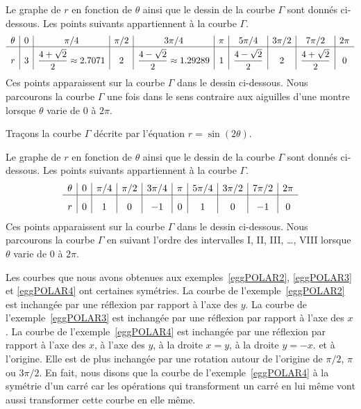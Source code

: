 {\begin{egg}
Le graphe de $r$ en fonction de $\theta$ ainsi que le dessin de la
courbe $\Gamma$ sont donnés ci-dessous.  Les points suivants
appartiennent à la courbe $\Gamma$.
\[
\begin{array}{*{9}{c|}c}
\theta & 0 & \pi/4 & \pi/2 & 3\pi/4 & \pi & 5\pi/4 & 3\pi/2 & 7\pi/2 &
2\pi \\
\hline
\rule{0pt}{1.8em} r & 3 &
\DS \frac{4+\sqrt{2}}{2} \approx 2.7071 & 2 &
\DS \frac{4-\sqrt{2}}{2} \approx 1.29289
& 1 & \DS \frac{4-\sqrt{2}}{2} & 2 &
\DS \frac{4+\sqrt{2}}{2} & 0
\end{array}
\]
Ces points apparaissent sur la courbe $\Gamma$ dans le dessin
ci-dessous.  Nous parcourons la courbe $\Gamma$ une fois dans le sens
contraire aux aiguilles d'une montre lorsque $\theta$ varie de $0$ à
$2\pi$.
\label{eggPOLAR3}
\end{egg}

\begin{egg}
Traçons la courbe $\Gamma$ décrite par l'équation
$r = \sin(2\theta)$.

Le graphe de $r$ en fonction de $\theta$ ainsi que le dessin de la
courbe $\Gamma$ sont donnés ci-dessous.  Les points suivants
appartiennent à la courbe $\Gamma$.
\[
\begin{array}{*{9}{c|}c}
\theta & 0 & \pi/4 & \pi/2 & 3\pi/4 & \pi & 5\pi/4 & 3\pi/2 & 7\pi/2 &
2\pi \\
\hline
\rule{0pt}{1.5em} r & 0 & 1 & 0 & -1 & 0 & 1 & 0 & -1 & 0
\end{array}
\]
Ces points apparaissent sur la courbe $\Gamma$ dans le dessin
ci-dessous.  Nous parcourons la courbe $\Gamma$ en suivant l'ordre des
intervalles I, II, III, \ldots, VIII lorsque $\theta$ varie de $0$ à
$2\pi$.
\label{eggPOLAR4}
\end{egg}

\begin{rmk}
Les courbes que nous avons obtenues aux exemples~\ref{eggPOLAR2},
\ref{eggPOLAR3} et \ref{eggPOLAR4} ont certaines symétries.  La courbe
de l'exemple~\ref{eggPOLAR2} est inchangée par une réflexion par
rapport à l'axe des $y$.  La courbe de l'exemple~\ref{eggPOLAR3} est
inchangée par une réflexion par rapport à l'axe des $x$.  La courbe de
l'exemple~\ref{eggPOLAR4} est inchangée par une réflexion par rapport
à l'axe des $x$, à l'axe des $y$, à la droite $x=y$, à la droite
$y=-x$. et à l'origine.  Elle est de plus inchangée par une rotation
autour de l'origine de $\pi/2$, $\pi$ ou $3\pi/2$.  En fait, nous
disons que la courbe de l'exemple~\ref{eggPOLAR4} à la symétrie d'un
carré car les opérations qui transforment un carré en lui même vont aussi
transformer cette courbe en elle même.


\end{rmk}}
